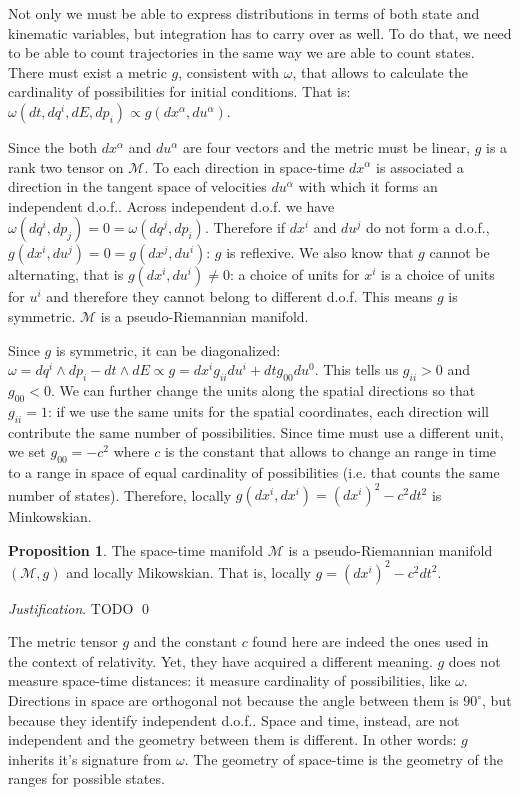 \documentclass[aps,pra,10pt,twocolumn,floatfix,nofootinbib]{revtex4-1}
\numberwithin{equation}{section}
\theoremstyle{definition}
\newtheorem{prop}[equation]{Proposition}
\newenvironment{justification}{\emph{Justification}.}{\qed}
\begin{document}
Not only we must be able to express distributions in terms of both state and kinematic variables, but integration has to carry over as well. To do that, we need to be able to count trajectories in the same way we are able to count states. There must exist a metric $g$, consistent with $\omega$, that allows to calculate the cardinality of possibilities for initial conditions. That is: $\omega(dt,dq^i,dE,dp_i) \propto g(dx^\alpha,du^\alpha)$.

Since the both $dx^\alpha$ and $du^\alpha$ are four vectors and the metric must be linear, $g$ is a rank two tensor on $\mathcal{M}$. To each direction in space-time $dx^\alpha$ is associated a direction in the tangent space of velocities $du^\alpha$ with which it forms an independent d.o.f.. Across independent d.o.f. we have $\omega(dq^i, dp_j) = 0 =\omega(dq^j, dp_i)$. Therefore if $dx^i$ and $du^j$ do not form a d.o.f., $g(dx^i, du^j) = 0 = g(dx^j, du^i)$: $g$ is reflexive. We also know that $g$ cannot be alternating, that is $g(dx^i, du^i) \neq 0$: a choice of units for $x^i$ is a choice of units for $u^i$ and therefore they cannot belong to different d.o.f. This means $g$ is symmetric. $\mathcal{M}$ is a pseudo-Riemannian manifold.

Since $g$ is symmetric, it can be diagonalized: $\omega= dq^i \wedge dp_i - dt \wedge dE \propto g = dx^i g_{ii} du^i + dt g_{00} du^0$. This tells us $g_{ii} > 0$ and $g_{00} < 0$. We can further change the units along the spatial directions so that $g_{ii}=1$: if we use the same units for the spatial coordinates, each direction will contribute the same number of possibilities. Since time must use a different unit, we set $g_{00}=-c^2$ where $c$ is the constant that allows to change an range in time to a range in space of equal cardinality of possibilities (i.e. that counts the same number of states). Therefore, locally $g(dx^i, dx^i) = (dx^i)^2 - c^2 dt^2$ is Minkowskian.

\begin{prop}\label{riemannian_manifold}
	The space-time manifold $\mathcal{M}$ is a pseudo-Riemannian manifold $(\mathcal{M}, g)$ and locally Mikowskian. That is, locally $g = (dx^i)^2 - c^2 dt^2$.
\end{prop}

\begin{justification}
	TODO
\end{justification}

The metric tensor $g$ and the constant $c$ found here are indeed the ones used in the context of relativity. Yet, they have acquired a different meaning. $g$ does not measure space-time distances: it measure cardinality of possibilities, like $\omega$. Directions in space are orthogonal not because the angle between them is $90^\circ$, but because they identify independent d.o.f.. Space and time, instead, are not independent and the geometry between them is different. In other words: $g$ inherits it's signature from $\omega$. The geometry of space-time is the geometry of the ranges for possible states.
\end{document}

